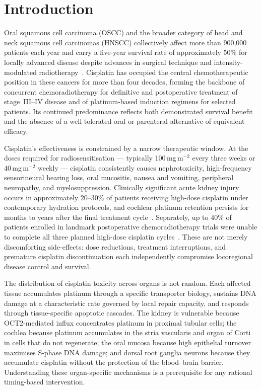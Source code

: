 \documentclass[preprint,review,12pt]{elsarticle}
\begin{document}
\linenumbers

\section{Introduction}
\label{sec:intro}


Oral squamous cell carcinoma (OSCC) and the broader category of head and
neck squamous cell carcinomas (HNSCC) collectively affect more than
900,000 patients each year and carry a five-year survival rate of
approximately 50\% for locally advanced disease despite advances in
surgical technique and intensity-modulated radiotherapy~\cite{Kelland2007}.
Cisplatin has occupied the central chemotherapeutic position in these
cancers for more than four decades, forming the backbone of concurrent
chemoradiotherapy for definitive and postoperative treatment of
stage~III--IV disease and of platinum-based induction regimens for
selected patients.  Its continued predominance reflects both demonstrated
survival benefit and the absence of a well-tolerated oral or parenteral
alternative of equivalent efficacy.

Cisplatin's effectiveness is constrained by a narrow therapeutic window.
At the doses required for radiosensitisation --- typically
100\,mg\,m$^{-2}$ every three weeks or 40\,mg\,m$^{-2}$ weekly --- cisplatin consistently causes nephrotoxicity, high-frequency sensorineural
hearing loss, oral mucositis, nausea and vomiting, peripheral neuropathy,
and myelosuppression.  Clinically significant acute kidney injury occurs in approximately
20--30\% of patients receiving high-dose cisplatin under contemporary
hydration protocols, and cochlear platinum retention persists for months
to years after the final treatment cycle~\cite{Karasawa2015}.
Separately, up to 40\% of patients enrolled in landmark postoperative
chemoradiotherapy trials were unable to complete all three planned
high-dose cisplatin cycles~\cite{Bernier2004, Strojan2016}.  These are
not merely discomforting side-effects: dose reductions, treatment
interruptions, and premature cisplatin discontinuation each independently
compromise locoregional disease control and survival.

The distribution of cisplatin toxicity across organs is not random.
Each affected tissue accumulates platinum through a specific transporter
biology, sustains DNA damage at a characteristic rate governed by local
repair capacity, and responds through tissue-specific apoptotic cascades.
The kidney is vulnerable because OCT2-mediated influx concentrates
platinum in proximal tubular cells; the cochlea because platinum
accumulates in the stria vascularis and organ of Corti in cells that do
not regenerate; the oral mucosa because high epithelial turnover maximises
S-phase DNA damage; and dorsal root ganglia neurons because they
accumulate cisplatin without the protection of the blood--brain barrier.
Understanding these organ-specific mechanisms is a prerequisite for any
rational timing-based intervention.
\end{document}
